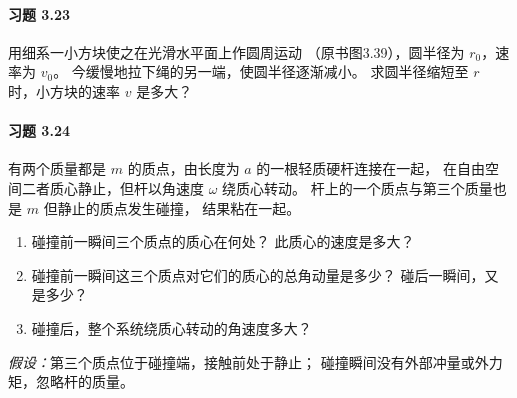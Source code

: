 \paragraph{习题 3.23}
用细系一小方块使之在光滑水平面上作圆周运动
（原书图3.39），圆半径为 \(r_0\)，速率为 \(v_0\)。
今缓慢地拉下绳的另一端，使圆半径逐渐减小。
求圆半径缩短至 \(r\) 时，小方块的速率 \(v\) 是多大？

\paragraph{习题 3.24}
有两个质量都是 \(m\) 的质点，由长度为 \(a\) 的一根轻质硬杆连接在一起，
在自由空间二者质心静止，但杆以角速度 \(\omega\) 绕质心转动。
杆上的一个质点与第三个质量也是 \(m\) 但静止的质点发生碰撞，
结果粘在一起。
\begin{enumerate}
\item 碰撞前一瞬间三个质点的质心在何处？
此质心的速度是多大？
\item 碰撞前一瞬间这三个质点对它们的质心的总角动量是多少？
碰后一瞬间，又是多少？
\item 碰撞后，整个系统绕质心转动的角速度多大？
\end{enumerate}
\textit{假设：}第三个质点位于碰撞端，接触前处于静止；
碰撞瞬间没有外部冲量或外力矩，忽略杆的质量。
